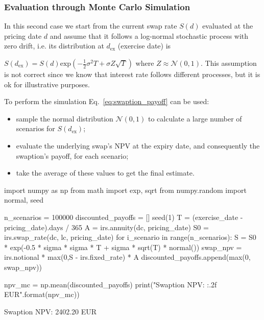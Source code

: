 \subsubsection{Evaluation through Monte Carlo Simulation}
\label{evaluation-through-monte-carlo-simulation}

In this second case we start from the current swap rate \(S(d)\) evaluated at the pricing date \(d\) and assume that it follows a log-normal stochastic process with zero drift, i.e. its distribution at \(d_{\mathrm{ex}}\) (exercise date) is 

\(S(d_{\mathrm{ex}}) = S(d)\mathrm{exp}(-\frac{1}{2}\sigma^{2}T+\sigma Z\sqrt{T})\)
\noindent
where $Z\approx\mathcal{N}(0,1)$. This assumption is not correct since we know that interest rate follows different processes, but it is ok for illustrative purposes. 

To perform the simulation Eq.~\ref{eq:swaption_payoff} can be used:

\begin{itemize}
\tightlist
\item sample the normal distribution \(\mathcal{N}(0, 1)\) to calculate a large number of scenarios for \(S(d_{\mathrm{ex}})\);
\item evaluate the underlying swap's NPV at the expiry date, and consequently the swaption's payoff, for each scenario;
\item take the average of these values to get the final estimate.
\end{itemize}

\begin{ipython}
import numpy as np
from math import exp, sqrt
from numpy.random import normal, seed

n_scenarios = 100000
discounted_payoffs = []
seed(1)
T = (exercise_date - pricing_date).days / 365
A = irs.annuity(dc, pricing_date)
S0 = irs.swap_rate(dc, lc, pricing_date)
for i_scenario in range(n_scenarios):
    S = S0 * exp(-0.5 * sigma * sigma * T +
        sigma * sqrt(T) * normal())
    swap_npv = irs.notional * max(0,S - irs.fixed_rate) * A
    discounted_payoffs.append(max(0, swap_npv))

npv_mc = np.mean(discounted_payoffs)
print("Swaption NPV: {:.2f} EUR".format(npv_mc))
\end{ipython}
\begin{ioutput}
Swaption NPV: 2402.20 EUR
\end{ioutput}

%

